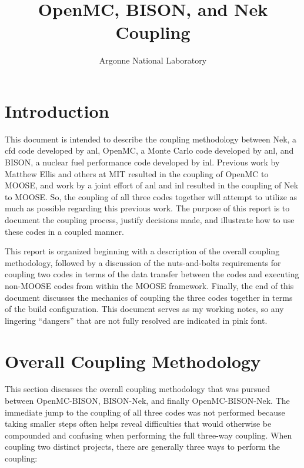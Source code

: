 \documentclass[10pt]{article}
\numberwithin{equation}{section} %
\begin{document}
\title{OpenMC, BISON, and Nek Coupling}
\author{Argonne National Laboratory}
\maketitle

\tableofcontents

\clearpage

\section{Introduction}

This document is intended to describe the coupling methodology between Nek, a \gls{cfd} code developed by \gls{anl}, OpenMC, a Monte Carlo code developed by \gls{anl}, and BISON, a nuclear fuel performance code developed by \gls{inl}. Previous work by Matthew Ellis and others at MIT resulted in the coupling of OpenMC to MOOSE, and work by a joint effort of \gls{anl} and \gls{inl} resulted in the coupling of Nek to MOOSE. So, the coupling of all three codes together will attempt to utilize as much as possible regarding this previous work. The purpose of this report is to document the coupling process, justify decisions made, and illustrate how to use these codes in a coupled manner.

This report is organized beginning with a description of the overall coupling methodology, followed by a discussion of the nuts-and-bolts requirements for coupling two codes in terms of the data transfer between the codes and executing non-MOOSE codes from within the MOOSE framework. Finally, the end of this document discusses the mechanics of coupling the three codes together in terms of the build configuration. This document serves as my working notes, so any lingering ``dangers'' that are not fully resolved are indicated in pink font.

\clearpage
\section{Overall Coupling Methodology}
This section discusses the overall coupling methodology that was pursued between OpenMC-BISON, BISON-Nek, and finally OpenMC-BISON-Nek. The immediate jump to the coupling of all three codes was not performed because taking smaller steps often helps reveal difficulties that would otherwise be compounded and confusing when performing the full three-way coupling. When coupling two distinct projects, there are generally three ways to perform the coupling:
\end{document}
